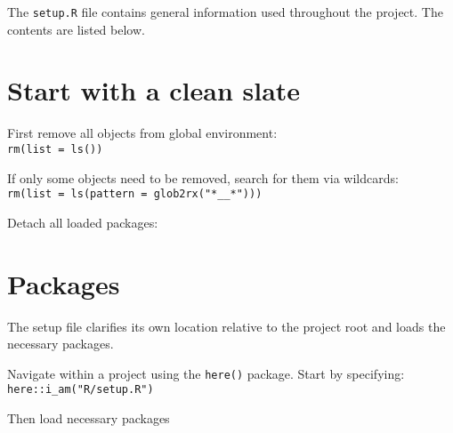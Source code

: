\documentclass[
  letterpaper,
  DIV=11,
  numbers=noendperiod]{scrreport}
\newenvironment{Shaded}{\begin{snugshade}}{\end{snugshade}}
\newcommand{\AttributeTok}[1]{\textcolor[rgb]{0.40,0.45,0.13}{#1}}
\newcommand{\ConstantTok}[1]{\textcolor[rgb]{0.56,0.35,0.01}{#1}}
\newcommand{\ControlFlowTok}[1]{\textcolor[rgb]{0.00,0.23,0.31}{\textbf{#1}}}
\newcommand{\FunctionTok}[1]{\textcolor[rgb]{0.28,0.35,0.67}{#1}}
\newcommand{\NormalTok}[1]{\textcolor[rgb]{0.00,0.23,0.31}{#1}}
\newcommand{\SpecialCharTok}[1]{\textcolor[rgb]{0.37,0.37,0.37}{#1}}
\newcommand{\StringTok}[1]{\textcolor[rgb]{0.13,0.47,0.30}{#1}}
\begin{document}
The \texttt{setup.R} file contains general information used throughout
the project. The contents are listed below.

\section{Start with a clean slate}\label{start-with-a-clean-slate}

First remove all objects from global environment:\\
\texttt{rm(list\ =\ ls())}

If only some objects need to be removed, search for them via
wildcards:\\
\texttt{rm(list\ =\ ls(pattern\ =\ glob2rx("*\_\_*")))}

Detach all loaded packages:

\begin{Shaded}
\end{Shaded}

\section{Packages}\label{packages}

The setup file clarifies its own location relative to the project root
and loads the necessary packages.

Navigate within a project using the \texttt{here()} package. Start by
specifying:\\
\texttt{here::i\_am("R/setup.R")}

Then load necessary packages
\end{document}
